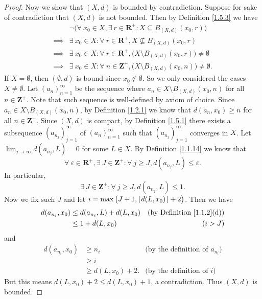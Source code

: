 \begin{proof}
    Now we show that \((X, d)\) is bounded by contradiction.
    Suppose for sake of contradiction that \((X, d)\) is not bounded.
    Then by Definition \ref{1.5.3} we have
    \begin{align*}
                 & \lnot\big(\forall\ x_0 \in X, \exists\ r \in \mathbf{R}^+ : X \subseteq B_{(X, d)}(x_0, r)\big)            \\
        \implies & \exists\ x_0 \in X : \forall\ r \in \mathbf{R}^+, X \not\subseteq B_{(X, d)}(x_0, r)                       \\
        \implies & \exists\ x_0 \in X : \forall\ r \in \mathbf{R}^+, \big(X \setminus B_{(X, d)}(x_0, r)\big) \neq \emptyset  \\
        \implies & \exists\ x_0 \in X : \forall\ n \in \mathbf{Z}^+, \big(X \setminus B_{(X, d)}(x_0, n)\big) \neq \emptyset.
    \end{align*}
    If \(X = \emptyset\), then \((\emptyset, d)\) is bound since \(x_0 \notin \emptyset\).
    So we only considered the cases \(X \neq \emptyset\).
    Let \((a_n)_{n = 1}^\infty\) be the sequence where \(a_n \in X \setminus B_{(X, d)}(x_0, n)\) for all \(n \in \mathbf{Z}^+\).
    Note that such sequence is well-defined by axiom of choice.
    Since \(a_n \in X \setminus B_{(X, d)}(x_0, n)\), by Definition \ref{1.2.1} we know that \(d(a_n, x_0) \geq n\) for all \(n \in \mathbf{Z}^+\).
    Since \((X, d)\) is compact, by Definition \ref{1.5.1} there exists a subsequence \((a_{n_j})_{j = 1}^\infty\) of \((a_n)_{n = 1}^\infty\) such that \((a_{n_j})_{j = 1}^\infty\) converges in \(X\).
    Let \(\lim_{j \to \infty} d(a_{n_j}, L) = 0\) for some \(L \in X\).
    By Definition \ref{1.1.14} we know that
    \[
        \forall\ \varepsilon \in \mathbf{R}^+, \exists\ J \in \mathbf{Z}^+ : \forall\ j \geq J, d(a_{n_j}, L) \leq \varepsilon.
    \]
    In particular,
    \[
        \exists\ J \in \mathbf{Z}^+ : \forall\ j \geq J, d(a_{n_j}, L) \leq 1.
    \]
    Now we fix such \(J\) and let \(i = \max\big(J + 1, \lceil d(L, x_0)\rceil + 2\big)\).
    Then we have
    \begin{align*}
        d(a_{n_i}, x_0) & \leq d(a_{n_i}, L) + d(L, x_0) & \text{(by Definition \ref{1.1.2}(d))} \\
                        & \leq 1 + d(L, x_0)             & (i > J)
    \end{align*}
    and
    \begin{align*}
        d(a_{n_i}, x_0) & \geq n_i            & \text{(by the definition of \(a_{n_i}\))} \\
                        & \geq i                                                          \\
                        & \geq d(L, x_0) + 2. & \text{(by the definition of \(i\))}
    \end{align*}
    But this means \(d(L, x_0) + 2 \leq d(L, x_0) + 1\), a contradiction.
    Thus \((X, d)\) is bounded.
\end{proof}

